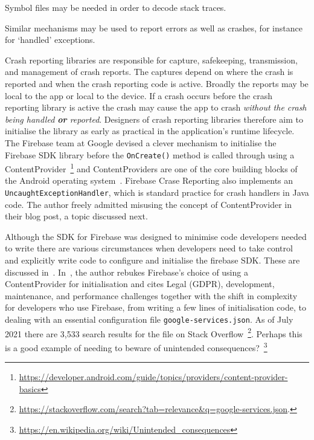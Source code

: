 Symbol files may be needed in order to decode stack traces. 

Similar mechanisms may be used to report errors as well as crashes, for instance for `handled' exceptions.

Crash reporting libraries are responsible for capture, safekeeping, transmission, and management of crash reports. The captures depend on where the crash is reported and when the crash reporting code is active. Broadly the reports may be local to the app or local to the device. If a crash occurs before the crash reporting library is active the crash may cause the app to crash \emph{without the crash being handled \textbf{or} reported}. Designers of crash reporting libraries therefore aim to initialise the library as early as practical in the application's runtime lifecycle. The Firebase team at Google devised a clever mechanism to initialise the Firebase SDK library before the \texttt{OnCreate()} method is called through using a ContentProvider~\footnote{\url{https://developer.android.com/guide/topics/providers/content-provider-basics}} and ContentProviders are one of the core building blocks of the Android operating system~\citep{firebaseblog2016_how_does_firebase_initialize_on_android}. Firebase Crase Reporting also implements an \texttt{UncaughtExceptionHandler}, which is standard practice for crash handlers in Java code. The author freely admitted misusing the concept of ContentProvider in their blog post, a topic discussed next.

\label{Firebase-SDK-ContentProvider}
Although the SDK for Firebase was designed to minimise code developers needed to write there are various circumstances when developers need to take control and explicitly write code to configure and initialise the firebase SDK. These are discussed in~\citep{firebaseblog2017_take_control_of_your_firebase_init_on_android}. In~\citep{techyourchance2021_contentprovider_in_android_libraries_considered_harmful}, the author rebukes Firebase's choice of using a ContentProvider for initialisation and cites Legal (GDPR), development, maintenance, and performance challenges together with the shift in complexity for developers who use Firebase, from writing a few lines of initialisation code, to dealing with an essential configuration file \texttt{google-services.json}. As of  July 2021 there are 3,533 search results for the file on Stack Overflow~\footnote{\url{https://stackoverflow.com/search?tab=relevance&q=google-services.json}.}. Perhaps this is a good example of needing to beware of unintended consequences?~\footnote{\url{https://en.wikipedia.org/wiki/Unintended_consequences}}

